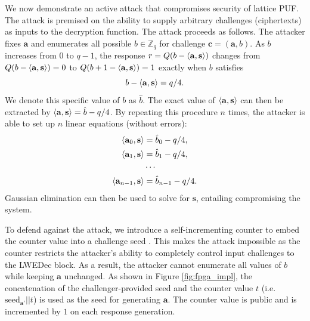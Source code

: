 We now demonstrate an active attack that compromises security of lattice PUF. The attack is premised on the ability to supply arbitrary challenges (ciphertexts) as inputs to the decryption function. 
The attack proceeds as follows. 
The attacker fixes $\mathbf{a}$ and enumerates all possible $b\in \mathbb{Z}_q$ for challenge $\mathbf{c} = (\mathbf{a},b)$.
As $b$ increases from $0$ to $q-1$, the response $r = Q(b-\langle\mathbf{a},\mathbf{s}\rangle)$ changes from  $Q(b-\langle\mathbf{a},\mathbf{s}\rangle) = 0$ to $Q(b+1-\langle\mathbf{a},\mathbf{s}\rangle) = 1$ exactly when $b$ satisfies
\begin{equation*}
b-\langle\mathbf{a},\mathbf{s}\rangle = q/4.
\end{equation*}
We denote this specific value of $b$ as $\hat{b}$. 
The exact value of $\langle\mathbf{a},\mathbf{s}\rangle$ can then be extracted by $\langle\mathbf{a},\mathbf{s}\rangle = \hat{b} - q/4$. 
By repeating this procedure $n$ times, the attacker is able to set up $n$ linear equations (without errors):  
\begin{align*}
\label{eq:secret_eqs}
    \langle\mathbf{a}_0,\mathbf{s}\rangle &= \hat{b}_0 - q/4, \\
    \langle\mathbf{a}_1,\mathbf{s}\rangle &= \hat{b}_1 - q/4, \\
    & \cdots \\
    \langle\mathbf{a}_{n-1},\mathbf{s}\rangle &= \hat{b}_{n-1} - q/4.
\end{align*}
Gaussian elimination can then be used to solve for $\mathbf{s}$, entailing compromising the system. 

To defend against the attack, we introduce a self-incrementing counter to embed the counter value into a challenge seed \cite{yu2016lockdown}.
This makes the attack impossible as the counter restricts the attacker's ability to completely control input challenges to the LWEDec block.
As a result, the attacker cannot enumerate all values of $b$ while keeping $\mathbf{a}$ unchanged. 
As shown in Figure \ref{fig:fpga_impl}, the concatenation of the challenger-provided seed and the counter value $t$ (i.e. $\text{seed}_{\mathbf{a}'}||t$) is used as the seed for generating $\mathbf{a}$. 
The counter value is public and is incremented by $1$ on each response generation.

